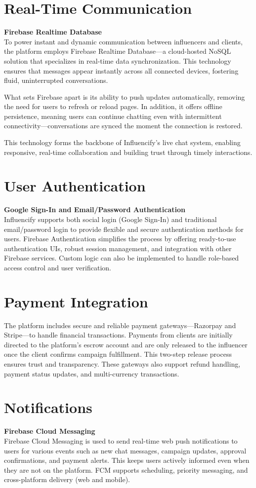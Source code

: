 \begin{justify}
\section{Real-Time Communication}
\textbf{Firebase Realtime Database}\\
To power instant and dynamic communication between influencers and clients, the platform employs Firebase Realtime Database—a cloud-hosted NoSQL solution that specializes in real-time data synchronization. This technology ensures that messages appear instantly across all connected devices, fostering fluid, uninterrupted conversations.
\par
What sets Firebase apart is its ability to push updates automatically, removing the need for users to refresh or reload pages. In addition, it offers offline persistence, meaning users can continue chatting even with intermittent connectivity—conversations are synced the moment the connection is restored.
\par
This technology forms the backbone of Influencify's live chat system, enabling responsive, real-time collaboration and building trust through timely interactions.
\section{User Authentication}
\textbf{Google Sign-In and Email/Password Authentication}\\
Influencify supports both social login (Google Sign-In) and traditional email/password login to provide flexible and secure authentication methods for users. Firebase Authentication simplifies the process by offering ready-to-use authentication UIs, robust session management, and integration with other Firebase services. Custom logic can also be implemented to handle role-based access control and user verification.
\section{Payment Integration}
The platform includes secure and reliable payment gateways—Razorpay and Stripe—to handle financial transactions. Payments from clients are initially directed to the platform's escrow account and are only released to the influencer once the client confirms campaign fulfillment. This two-step release process ensures trust and transparency. These gateways also support refund handling, payment status updates, and multi-currency transactions.

\section{ Notifications }
\textbf{Firebase Cloud Messaging }\\
Firebase Cloud Messaging is used to send real-time web push notifications to users for various events such as new chat messages, campaign updates, approval confirmations, and payment alerts. This keeps users actively informed even when they are not on the platform. FCM supports scheduling, priority messaging, and cross-platform delivery (web and mobile).


\end{justify}
